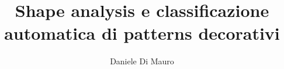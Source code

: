 \documentclass[a4paper,12pt]{book}
\begin{document}
\title  {Shape analysis e classificazione automatica di patterns decorativi}
\author  {Daniele Di Mauro}
            

\maketitle





\end{document}
